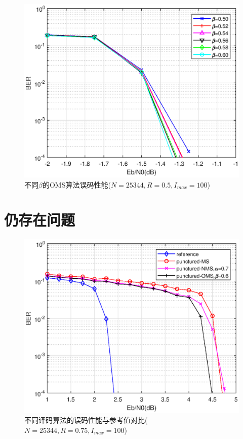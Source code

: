 \documentclass{article}
\begin{document}
\begin{figure}[H]
	\centering
	\includegraphics[width = .75\textwidth]{oms0506.eps}
	\caption{{不同$\beta$的OMS算法误码性能($N=25344,R=0.5,I_{max}=100$)}}
\end{figure}

\section{仍存在问题}
\begin{figure}[H]
	\centering
	\includegraphics[width = .75\textwidth]{noms_r34.eps}
	\caption{{不同译码算法的误码性能与参考值对比($N=25344,R=0.75,I_{max}=100$)}}
\end{figure}

\end{document}
